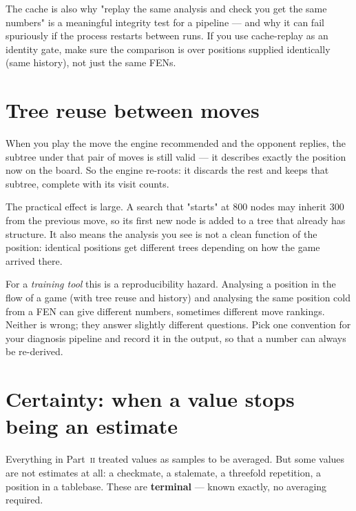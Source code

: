 \begin{repobox}[title={in this repository}]
The cache is also why "replay the same analysis and check you get the same numbers" is a
meaningful integrity test for a pipeline --- and why it can fail spuriously if the process
restarts between runs. If you use cache-replay as an identity gate, make sure the comparison
is over positions supplied identically (same history), not just the same FENs.
\end{repobox}

\section{Tree reuse between moves}

When you play the move the engine recommended and the opponent replies, the subtree under
that pair of moves is still valid --- it describes exactly the position now on the board. So
the engine re-roots: it discards the rest and keeps that subtree, complete with its visit
counts.

The practical effect is large. A search that "starts" at 800 nodes may inherit 300 from the
previous move, so its first new node is added to a tree that already has structure. It also
means the analysis you see is not a clean function of the position: identical positions get
different trees depending on how the game arrived there.

\begin{pitfall}
For a \emph{training tool} this is a reproducibility hazard. Analysing a position in the flow
of a game (with tree reuse and history) and analysing the same position cold from a FEN can
give different numbers, sometimes different move rankings. Neither is wrong; they answer
slightly different questions. Pick one convention for your diagnosis pipeline and record it
in the output, so that a number can always be re-derived.
\end{pitfall}

\section{Certainty: when a value stops being an estimate}

Everything in Part~\textsc{ii} treated values as samples to be averaged. But some values are
not estimates at all: a checkmate, a stalemate, a threefold repetition, a position in a
tablebase. These are \textbf{terminal} --- known exactly, no averaging required.

